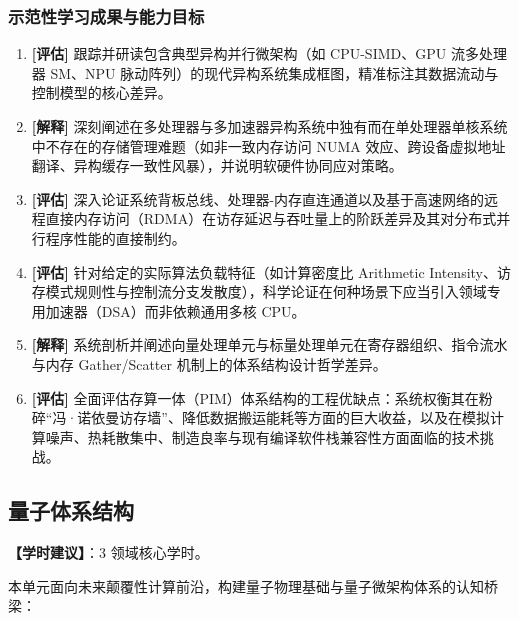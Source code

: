 \subsubsection{示范性学习成果与能力目标}
\begin{enumerate}
    \item \textbf{[评估]} 跟踪并研读包含典型异构并行微架构（如 CPU-SIMD、GPU 流多处理器 SM、NPU 脉动阵列）的现代异构系统集成框图，精准标注其数据流动与控制模型的核心差异。
    \item \textbf{[解释]} 深刻阐述在多处理器与多加速器异构系统中独有而在单处理器单核系统中不存在的存储管理难题（如非一致内存访问 NUMA 效应、跨设备虚拟地址翻译、异构缓存一致性风暴），并说明软硬件协同应对策略。
    \item \textbf{[评估]} 深入论证系统背板总线、处理器-内存直连通道以及基于高速网络的远程直接内存访问（RDMA）在访存延迟与吞吐量上的阶跃差异及其对分布式并行程序性能的直接制约。
    \item \textbf{[评估]} 针对给定的实际算法负载特征（如计算密度比 Arithmetic Intensity、访存模式规则性与控制流分支发散度），科学论证在何种场景下应当引入领域专用加速器（DSA）而非依赖通用多核 CPU。
    \item \textbf{[解释]} 系统剖析并阐述向量处理单元与标量处理单元在寄存器组织、指令流水与内存 Gather/Scatter 机制上的体系结构设计哲学差异。
    \item \textbf{[评估]} 全面评估存算一体（PIM）体系结构的工程优缺点：系统权衡其在粉碎“冯·诺依曼访存墙”、降低数据搬运能耗等方面的巨大收益，以及在模拟计算噪声、热耗散集中、制造良率与现有编译软件栈兼容性方面面临的技术挑战。
\end{enumerate}

\subsection{量子体系结构}
\textbf{【学时建议】}：3 领域核心学时。

本单元面向未来颠覆性计算前沿，构建量子物理基础与量子微架构体系的认知桥梁：

